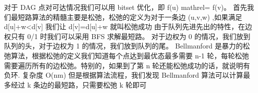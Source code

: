 {}对于 \markdownRendererDollarSign{}DAG\markdownRendererDollarSign{} 点对可达情况我们可以用 bitset 优化，即 \markdownRendererDollarSign{}f(u) \markdownRendererBackslash{}mathrel\markdownRendererLeftBrace{}\markdownRendererPipe{}\markdownRendererRightBrace{}= f(v)\markdownRendererDollarSign{}。\markdownRendererInterblockSeparator
{}\markdownRendererInterblockSeparator
{}
\markdownRendererSectionEnd \markdownRendererSectionBegin
{}\markdownRendererInterblockSeparator
{}\markdownRendererSectionBegin
{}\markdownRendererInterblockSeparator
{}首先我们最短路算法的精髓主要是松弛，松弛的定义为对于一条边\markdownRendererDollarSign{} (u,v,w) \markdownRendererDollarSign{},如果满足\markdownRendererDollarSign{} d[u]+w<d[v] \markdownRendererDollarSign{}\markdownRendererParagraphSeparator
{}我们让\markdownRendererDollarSign{} d[v]=d[u]+w \markdownRendererDollarSign{}就叫松弛成功\markdownRendererInterblockSeparator
{}\markdownRendererSectionBegin
{}\markdownRendererInterblockSeparator
{}由于队列先进先出的特性，在边权只有\markdownRendererDollarSign{} 0/1 \markdownRendererDollarSign{}时我们可以采用\markdownRendererDollarSign{} BFS \markdownRendererDollarSign{}求解最短路。\markdownRendererParagraphSeparator
{}对于边权为\markdownRendererDollarSign{} 0 \markdownRendererDollarSign{}的情况，我们放到队列的头，对于边权为\markdownRendererDollarSign{} 1 \markdownRendererDollarSign{}的情况，我们放到队列的尾。\markdownRendererInterblockSeparator
{}
\markdownRendererSectionEnd \markdownRendererSectionBegin
{}\markdownRendererInterblockSeparator
{}\markdownRendererDollarSign{} Bellmanford \markdownRendererDollarSign{}是暴力的松弛算法，根据松弛的定义我们知道每个点达到最优态最多需要\markdownRendererDollarSign{} n-1 \markdownRendererDollarSign{}轮，每轮松弛需要遍历所有的边松弛。特别的，如果到了第\markdownRendererDollarSign{} n \markdownRendererDollarSign{}轮还能松弛成功的话，就说明有负环.\markdownRendererParagraphSeparator
{}复杂度\markdownRendererDollarSign{} O(nm) \markdownRendererDollarSign{}\markdownRendererParagraphSeparator
{}但是根据算法流程，我们发现\markdownRendererDollarSign{} Bellmanford \markdownRendererDollarSign{}算法可以计算最多经过\markdownRendererDollarSign{} k \markdownRendererDollarSign{}条边的最短路，只需要松弛\markdownRendererDollarSign{} k \markdownRendererDollarSign{}轮即可\markdownRendererInterblockSeparator
{}\markdownRendererInterblockSeparator
